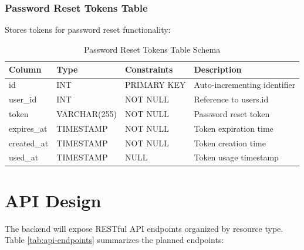 \subsubsection{Password Reset Tokens Table}

Stores tokens for password reset functionality:

\begin{table}[H]
    \centering
    \caption{Password Reset Tokens Table Schema}
    \label{tab:pwreset-tokens-schema}
    \begin{tabular}{llll}
        \toprule
        \textbf{Column} & \textbf{Type} & \textbf{Constraints} & \textbf{Description} \\
        \midrule
        id & INT & PRIMARY KEY & Auto-incrementing identifier \\
        user\_id & INT & NOT NULL & Reference to users.id \\
        token & VARCHAR(255) & NOT NULL & Password reset token \\
        expires\_at & TIMESTAMP & NOT NULL & Token expiration time \\
        created\_at & TIMESTAMP & NOT NULL & Token creation time \\
        used\_at & TIMESTAMP & NULL & Token usage timestamp \\
        \bottomrule
    \end{tabular}
\end{table}

\section{API Design}

The backend will expose RESTful API endpoints organized by resource type. Table \ref{tab:api-endpoints} summarizes the planned endpoints:

